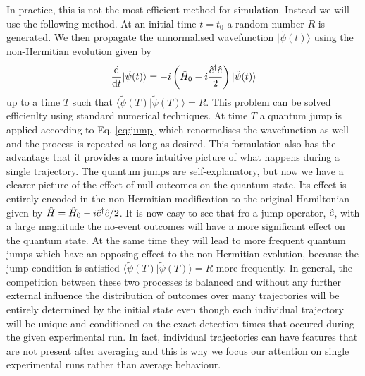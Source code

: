 In practice, this is not the most efficient method for
simulation. Instead we will use the following method. At an initial
time $t = t_0$ a random number $R$ is generated. We then propagate the
unnormalised wavefunction $| \tilde{\psi} (t) \rangle$ using the
non-Hermitian evolution given by
\begin{equation}
  \frac{\mathrm{d}}{\mathrm{d}t} | \tilde{\psi} (t) \rangle = -i
  \left( \hat{H}_0 - i \frac{\hat{c}^\dagger \hat{c}}{2} \right) | \tilde{\psi} (t) \rangle
\end{equation}
up to a time $T$ such that
$\langle \tilde{\psi} (T) | \tilde{\psi} (T) \rangle = R$. This
problem can be solved efficienlty using standard numerical
techniques. At time $T$ a quantum jump is applied according to
Eq. \eqref{eq:jump} which renormalises the wavefunction as well and
the process is repeated as long as desired. This formulation also has
the advantage that it provides a more intuitive picture of what
happens during a single trajectory. The quantum jumps are
self-explanatory, but now we have a clearer picture of the effect of
null outcomes on the quantum state. Its effect is entirely encoded in
the non-Hermitian modification to the original Hamiltonian given by
$\hat{H} = \hat{H}_0 - i \hat{c}^\dagger \hat{c} / 2$. It is now easy to see that fro a
jump operator, $\hat{c}$, with a large magnitude the no-event outcomes will
have a more significant effect on the quantum state. At the same time
they will lead to more frequent quantum jumps which have an opposing
effect to the non-Hermitian evolution, because the jump condition is
satisfied $\langle \tilde{\psi} (T) | \tilde{\psi} (T) \rangle = R$
more frequently. In general, the competition between these two
processes is balanced and without any further external influence the
distribution of outcomes over many trajectories will be entirely
determined by the initial state even though each individual trajectory
will be unique and conditioned on the exact detection times that
occured during the given experimental run. In fact, individual
trajectories can have features that are not present after averaging
and this is why we focus our attention on single experimental runs
rather than average behaviour.

